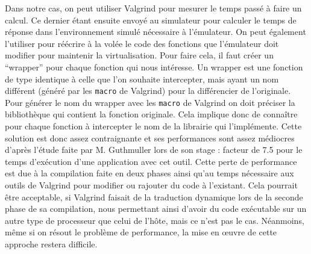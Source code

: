 Dans notre cas, on peut utiliser Valgrind pour mesurer le temps passé à faire un
calcul. Ce dernier étant ensuite envoyé au simulateur pour calculer le temps de
réponse dans l'environnement simulé nécessaire à l'émulateur. On peut
également l'utiliser pour réécrire à la volée le code des fonctions que
l'émulateur doit modifier pour maintenir la virtualisation. Pour faire cela, il
faut créer un ``wrapper'' pour chaque fonction qui nous intéresse. Un wrapper
est une fonction de type identique à celle que l'on souhaite intercepter, mais
ayant un nom différent (généré par les \texttt{macro} de Valgrind) pour la
différencier de l'originale. Pour générer le nom du wrapper avec
les \texttt{macro} de Valgrind on doit préciser la bibliothèque qui contient la
fonction originale. Cela implique donc de connaître pour chaque fonction à
intercepter le nom de la librairie qui l'implémente. Cette solution est donc
assez contraignante et ses performances sont assez médiocres d'après l'étude
faite par M. Guthmuller lors de son stage \citep{MARION:Interception}: facteur
de 7.5 pour le temps d'exécution d'une application avec cet outil. Cette perte
de performance est due à la compilation faite en deux phases ainsi qu'au temps
nécessaire aux outils de Valgrind pour modifier ou rajouter du code à
l'existant. Cela pourrait être acceptable, si Valgrind faisait de la traduction
dynamique lors de la seconde phase de sa compilation, nous permettant ainsi
d'avoir du code exécutable sur un autre type de processeur que celui de l'hôte,
mais ce n'est pas le cas. Néanmoins, même si on résout le problème de
performance, la mise en \oe uvre de cette approche restera difficile.
